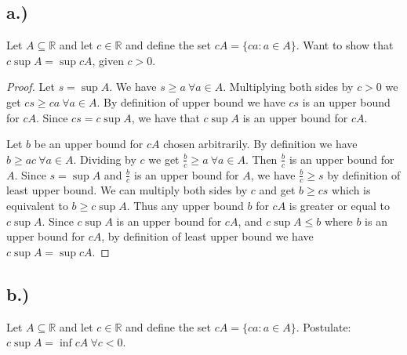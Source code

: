\documentclass{article}
\begin{document}
\subsection*{a.)}
Let $A \subseteq \mathbb{R}$ and let $c \in \mathbb{R}$ and define the set $cA = \{ ca: a \in A \}$. Want to show that $c \sup{A} = \sup{cA}$, given $c > 0$.
\begin{proof}
Let $s = \sup{A}$. We have $s \geqslant a \ \forall a \in A$. Multiplying both sides by $c > 0$ we get $cs \geqslant ca \ \forall a \in A$. By definition of upper bound we have $cs$ is an upper bound for $cA$. Since $cs = c \sup{A}$, we have that $c \sup{A}$ is an upper bound for $cA$.

Let $b$ be an upper bound for $cA$ chosen arbitrarily. By definition we have $b \geqslant ac \ \forall a \in A$. Dividing by $c$ we get $\frac{b}{c} \geqslant a \ \forall a \in A$. Then $\frac{b}{c}$ is an upper bound for $A$. Since $s = \sup{A}$ and $\frac{b}{c}$ is an upper bound for $A$, we have $\frac{b}{c} \geqslant s$ by definition of least upper bound. We can multiply both sides by $c$ and get $b \geqslant cs$ which is equivalent to $b \geqslant c \sup{A}$. Thus any upper bound $b$ for $cA$ is greater or equal to $c \sup{A}$. Since $c \sup{A}$ is an upper bound for $cA$, and $c \sup{A} \leqslant b$ where $b$ is an upper bound for $cA$, by definition of least upper bound we have $c \sup{A} = \sup{cA}$.

\end{proof}

\subsection*{b.)}
Let $A \subseteq \mathbb{R}$ and let $c \in \mathbb{R}$ and define the set $cA = \{ca : a \in A\}$. Postulate: $c \sup{A} = \inf{cA} \ \forall c < 0$.
\end{document}
